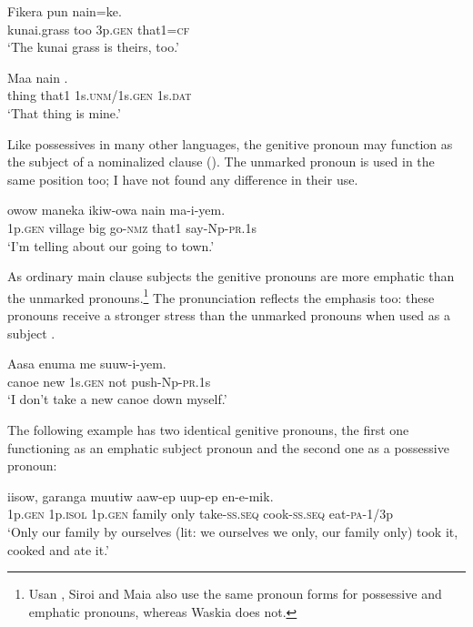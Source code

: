 \ea%
\label{ex:3:x577}
\gll Fikera pun  nain=ke. \\
kunai.grass too 3p.\textsc{gen} that1=\textsc{cf}\\
\glt`The kunai grass is theirs, too.'
\z

\ea%
\label{ex:3:x578}
\gll Maa nain  . \\
thing that1 1s.\textsc{unm}/1s.\textsc{gen} 1s.\textsc{dat}\\
\glt`That thing is mine.'
\z

Like possessives in many other languages, the genitive pronoun may function as the subject of a nominalized clause  (). The unmarked pronoun is used in the same position too; I have not found any difference in their use.

\ea%
\label{ex:3:x571}
\gll {} owow maneka ikiw-owa nain ma-i-yem. \\
1p.\textsc{gen} village big go-\textsc{nmz} that1 say-Np-\textsc{pr}.1s\\
\glt`I'm telling about our going to town.'
\z

As ordinary main clause subjects the genitive pronouns are more emphatic than the unmarked pronouns.\footnote{Usan \citep[55]{Reesink1987}, Siroi \citep[20]{Wells1979} and Maia \citep[73]{Hardin2002} also use the same pronoun forms for possessive and emphatic pronouns, whereas Waskia \citep{RossEtAl1978} does not.} The pronunciation reflects the emphasis too: these pronouns receive a stronger stress than the unmarked pronouns when used as a subject .

\ea%
\label{ex:3:x572}
\gll Aasa enuma  me suuw-i-yem. \\
canoe new 1s.\textsc{gen} not push-Np-\textsc{pr}.1s\\
\glt`I don't take a new canoe down myself.'
\z

The following example  has two identical genitive pronouns, the first one functioning as an emphatic subject pronoun and the second one as a possessive pronoun:

\ea%
\label{ex:3:x686}
\gll {} iisow,  garanga muutiw aaw-ep uup-ep en-e-mik.\\
1p.\textsc{gen} 1p.\textsc{isol} 1p.\textsc{gen} family only take-\textsc{ss}.\textsc{seq} cook-\textsc{ss}.\textsc{seq} eat-\textsc{pa}-1/3p\\
\glt`Only our family by ourselves (lit: we ourselves we only, our family only) took it, cooked and ate it.'
\z

